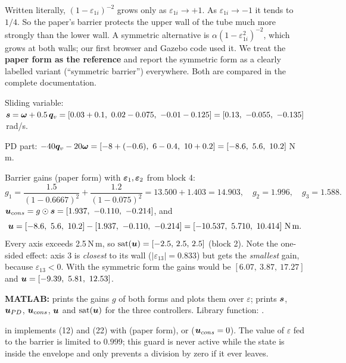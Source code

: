 \begin{warn}
Written literally, $(1-\varepsilon_{1i})^{-2}$ grows only as $\varepsilon_{1i}\to+1$. As $\varepsilon_{1i}\to-1$ it tends to
$1/4$. So the paper's barrier protects the upper wall of the tube much more strongly than the lower wall. A symmetric
alternative is $\alpha(1-\varepsilon_{1i}^2)^{-2}$, which grows at both walls; our first browser and Gazebo code used it.
We treat the \textbf{paper form as the reference} and report the symmetric form as a clearly labelled variant
(``symmetric barrier'') everywhere. Both are compared in the complete documentation.
\end{warn}

\begin{toybox}[the torque at $t=0$ for the Part-1 state, $\that(0)=0$]
Sliding variable: $\vs=\vw+0.5\,\qv=[0.03+0.1,\ 0.02-0.075,\ -0.01-0.125]=[0.13,\ -0.055,\ -0.135]$\,rad/s.

PD part: $-40\qv-20\vw=[-8+(-0.6),\ 6-0.4,\ 10+0.2]=[-8.6,\ 5.6,\ 10.2]$\,N\,m.

Barrier gains (paper form) with $\bm{\varepsilon}_1,\bm{\varepsilon}_2$ from block 4:
\[
g_1=\frac{1.5}{(1-0.6667)^2}+\frac{1.2}{(1-0.075)^2}=13.500+1.403=14.903,\quad g_2=1.996,\quad g_3=1.588 .
\]
$\vu_{cons}=g\odot\vs=[1.937,\ -0.110,\ -0.214]$, and
\[
\vu=[-8.6,\ 5.6,\ 10.2]-[1.937,\ -0.110,\ -0.214]=[-10.537,\ 5.710,\ 10.414]\ \text{N\,m}.
\]
Every axis exceeds 2.5\,N\,m, so $\operatorname{sat}(\bm{u})=[-2.5,\,2.5,\,2.5]$ (block 2). Note the one-sided effect: axis 3 is
\emph{closest} to its wall ($|\varepsilon_{13}|=0.833$) but gets the \emph{smallest} gain, because $\varepsilon_{13}<0$. With
the symmetric form the gains would be $[6.07,\ 3.87,\ 17.27]$ and $\bm{u}=[-9.39,\ 5.81,\ 12.53]$.
\end{toybox}

\begin{codebox}
\textbf{MATLAB:}  prints the gains $g$ of both forms and plots them over $\varepsilon$;
 prints $\bm{s}$, $\bm{u}_{PD}$, $\bm{u}_{cons}$, $\bm{u}$ and $\operatorname{sat}(\bm{u})$ for the three controllers.
Library function: .
\end{codebox}

\begin{projbox}
 in  implements (12) and (22) with  (paper form),
 or  ($\bm{u}_{cons}=0$). The value of $\varepsilon$ fed to the barrier is limited to $0.999$; this
guard is never active while the state is inside the envelope and only prevents a division by zero if it ever leaves.
\end{projbox}

